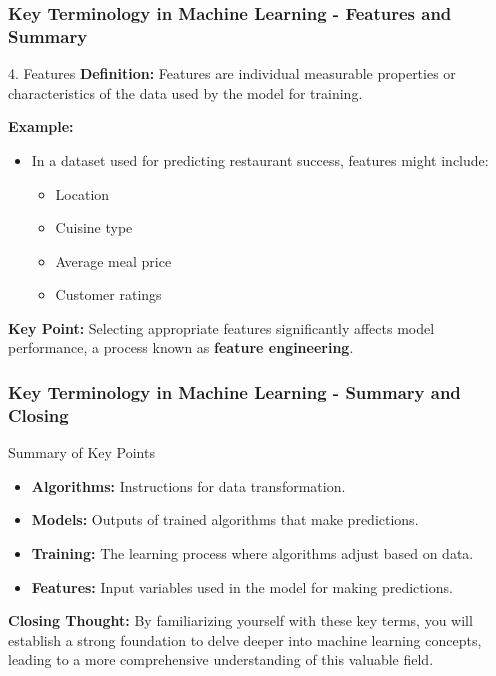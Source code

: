 \documentclass[aspectratio=169]{beamer}
\begin{document}
\begin{frame}[fragile]
    \frametitle{Key Terminology in Machine Learning - Features and Summary}
    \begin{block}{4. Features}
        \textbf{Definition:} Features are individual measurable properties or characteristics of the data used by the model for training.
    \end{block}
    
    \textbf{Example:}
    \begin{itemize}
        \item In a dataset used for predicting restaurant success, features might include:
        \begin{itemize}
            \item Location
            \item Cuisine type
            \item Average meal price
            \item Customer ratings
        \end{itemize}
    \end{itemize} 
    
    \textbf{Key Point:} Selecting appropriate features significantly affects model performance, a process known as \textbf{feature engineering}.
\end{frame}

\begin{frame}[fragile]
    \frametitle{Key Terminology in Machine Learning - Summary and Closing}
    \begin{block}{Summary of Key Points}
        \begin{itemize}
            \item \textbf{Algorithms:} Instructions for data transformation.
            \item \textbf{Models:} Outputs of trained algorithms that make predictions.
            \item \textbf{Training:} The learning process where algorithms adjust based on data.
            \item \textbf{Features:} Input variables used in the model for making predictions.
        \end{itemize}
    \end{block}

    \textbf{Closing Thought:} By familiarizing yourself with these key terms, you will establish a strong foundation to delve deeper into machine learning concepts, leading to a more comprehensive understanding of this valuable field.
\end{frame}
\end{document}
